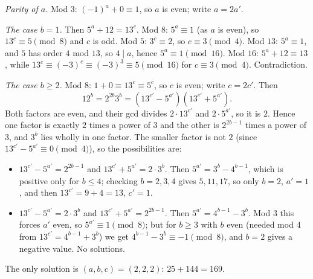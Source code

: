 \emph{Parity of $a$.} Mod $3$: $(-1)^a+0\equiv1$, so $a$ is even; write $a=2a'$.

\emph{The case $b=1$.} Then $5^a+12=13^c$. Mod $8$: $5^a\equiv1$ (as $a$ is even), so $13^c\equiv5\pmod8$ and $c$ is odd. Mod $5$: $3^c\equiv2$, so $c\equiv3\pmod4$. Mod $13$: $5^a\equiv1$, and $5$ has order $4$ mod $13$, so $4\mid a$, hence $5^a\equiv1\pmod{16}$. Mod $16$: $5^a+12\equiv13$, while $13^c\equiv(-3)^c\equiv(-3)^3\equiv5\pmod{16}$ for $c\equiv3\pmod4$. Contradiction.

\emph{The case $b\ge2$.} Mod $8$: $1+0\equiv13^c\equiv5^c$, so $c$ is even; write $c=2c'$. Then
\[12^b=2^{2b}3^b=\left(13^{c'}-5^{a'}\right)\left(13^{c'}+5^{a'}\right).\]
Both factors are even, and their gcd divides $2\cdot13^{c'}$ and $2\cdot5^{a'}$, so it is $2$. Hence one factor is exactly $2$ times a power of $3$ and the other is $2^{2b-1}$ times a power of $3$, and $3^b$ lies wholly in one factor. The smaller factor is not $2$ (since $13^{c'}-5^{a'}\equiv0\pmod4$), so the possibilities are:
\begin{itemize}
\item $13^{c'}-5^{a'}=2^{2b-1}$ and $13^{c'}+5^{a'}=2\cdot3^b$. Then $5^{a'}=3^b-4^{b-1}$, which is positive only for $b\le4$; checking $b=2,3,4$ gives $5,11,17$, so only $b=2$, $a'=1$, and then $13^{c'}=9+4=13$, $c'=1$.
\item $13^{c'}-5^{a'}=2\cdot3^b$ and $13^{c'}+5^{a'}=2^{2b-1}$. Then $5^{a'}=4^{b-1}-3^b$. Mod $3$ this forces $a'$ even, so $5^{a'}\equiv1\pmod8$; but for $b\ge3$ with $b$ even (needed mod $4$ from $13^{c'}=4^{b-1}+3^b$) we get $4^{b-1}-3^b\equiv-1\pmod8$, and $b=2$ gives a negative value. No solutions.
\end{itemize}
The only solution is $\boxed{(a,b,c)=(2,2,2)}$: $25+144=169$.
